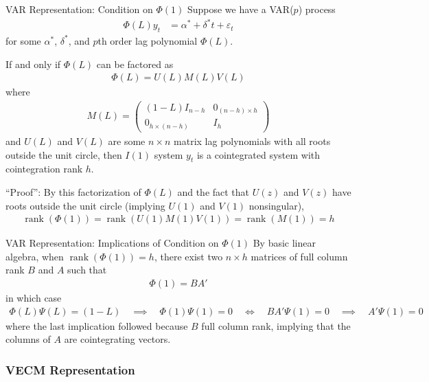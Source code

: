 \documentclass[aspectratio=169, handout]{beamer}
\newcommand{\rank}{\operatorname{rank}}
\begin{document}
{\footnotesize
\begin{frame}{VAR Representation: Condition on $\Phi(1)$}
Suppose we have a VAR($p$) process
\begin{align*}
  \Phi(L)y_t
  &=
  \alpha^* + \delta^* t
  + \varepsilon_t
\end{align*}
for some $\alpha^*$, $\delta^*$, and $p$th order lag polynomial
$\Phi(L)$.

If and only if $\Phi(L)$ can be factored as
\begin{align*}
  \Phi(L) = U(L)M(L)V(L)
\end{align*}
where
\begin{align*}
  M(L)
  =
  \begin{pmatrix}
    (1-L) I_{n-h}
    & 0_{(n-h)\times h}
    \\
    0_{h\times (n-h)}
    & I_h
  \end{pmatrix}
\end{align*}
and $U(L)$ and $V(L)$ are some $n\times n$ matrix lag polynomials with
all roots outside the unit circle, then $I(1)$ system $y_t$ is a
\alert{cointegrated} system with \alert{cointegration rank $h$}.

``Proof'': By this factorization of $\Phi(L)$ and the fact that $U(z)$
and $V(z)$ have roots outside the unit circle (implying $U(1)$ and
$V(1)$ nonsingular),
\begin{align*}
  \rank(\Phi(1))=\rank(U(1)M(1)V(1)) = \rank(M(1)) = h
\end{align*}
\end{frame}
}

{\footnotesize
\begin{frame}{VAR Representation: Implications of Condition on $\Phi(1)$}
By basic linear algebra, when $\rank(\Phi(1))=h$, there exist two
$n\times h$ matrices of full column rank $B$ and $A$ such that
\begin{align*}
  \Phi(1) = BA'
\end{align*}
in which case
\begin{align*}
  \Phi(L)\Psi(L) = (1-L)
  \quad\implies\quad
  \Phi(1)\Psi(1) = 0
  \quad\iff\quad
  BA'\Psi(1) = 0
  \quad\implies\quad
  A'\Psi(1) = 0
\end{align*}
where the last implication followed because $B$ full column rank,
implying that the columns of $A$ are cointegrating vectors.
\end{frame}
}


\subsubsection{VECM Representation}
\end{document}
